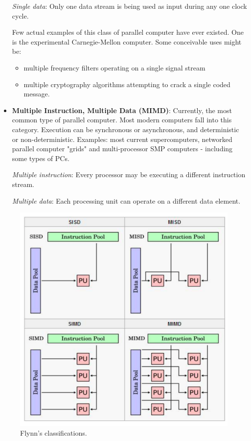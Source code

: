 \begin{itemize}
\textit{Single data}: Only one data stream is being used as input during any one clock cycle. 

Few actual examples of this class of parallel computer have ever existed. One is the experimental Carnegie-Mellon computer. Some conceivable uses might be:  \begin{itemize}
\item multiple frequency filters operating on a single signal stream  
\item multiple cryptography algorithms attempting to crack a single coded message.  
\end{itemize}

\item \textbf{Multiple Instruction, Multiple Data (MIMD)}: Currently, the most common type of parallel computer. Most modern computers fall 
into this category. Execution can be synchronous or asynchronous, and deterministic or non-deterministic. Examples: most current supercomputers, networked parallel computer "grids" and multi-processor SMP computers - including some types of PCs.  

\textit{Multiple instruction}: Every processor may be executing a different instruction stream.

\textit{Multiple data}: Each processing unit can operate on a different data element.
\end{itemize}

\begin{figure}
\centering
\includegraphics[width=0.7\linewidth]{screenshot052}
\caption{Flynn's classifications.}
\label{fig:screenshot052}
\end{figure}


